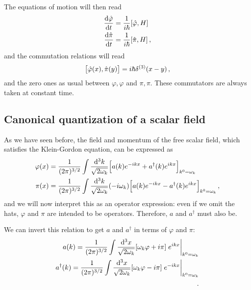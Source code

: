 \documentclass[main.tex]{subfiles}
\begin{document}
The equations of motion will then read 
%
\begin{subequations}
\begin{align}
\dv{\hat{\varphi}}{t} &= \frac{1}{i \hbar} \qty[\hat{\varphi}, H] \\
\dv{\hat{\pi}}{t} &= \frac{1}{i \hbar} \qty[\hat{\pi}, H] 
\,,
\end{align}
\end{subequations}
%
and the commutation relations will read 
%
\begin{align}
\qty[\hat{\varphi}(x), \hat{\pi }(y)] = i \hbar \delta^{(3)}(x-y)
\,,
\end{align}
%
and the zero ones as usual between \(\varphi, \varphi \) and \(\pi , \pi \).
These commutators are always taken at constant time. 

\subsection{Canonical quantization of a scalar field}

As we have seen before, the field and momentum of the free scalar field, which satisfies the Klein-Gordon equation, can be expressed as 
%
\begin{subequations}
\begin{align}
\varphi (x) &= \frac{1}{(2\pi )^{3/2}} \int \frac{ \dd[3]{k}}{\sqrt{2 \omega_{k}}} \qty[a(k) e^{-ikx} + a^{\dag}(k) e^{ikx}]_{k^{0} =\omega_{k}} \\
\pi (x) &= \frac{1}{(2\pi )^{3/2}} \int \frac{ \dd[3]{k}}{\sqrt{2 \omega_{k}}} (-i \omega_{k}) \qty[a(k) e^{-ikx} - a^{\dag}(k) e^{ikx}]_{k^{0} =\omega_{k}} 
\,,
\end{align}
\end{subequations}
%
and we will now interpret this as an operator expression: even if we omit the hats, \(\varphi \) and \(\pi \) are intended to be operators. 
Therefore, \(a\) and \(a^{\dag}\) must also be. 

\begin{claim}
We can invert this relation to get \(a\) and \(a^{\dag}\) in terms of \(\varphi \) and \(\pi \): 
%
\begin{subequations}
\begin{align}
    a(k) = \frac{1}{(2 \pi )^{3/2}} \int \frac{ \dd[3]{x}}{\sqrt{2 \omega_{k}}} \qty[\omega_{k} \varphi + i \pi ] \eval{e^{ikx}}_{k^{0}= \omega_{k}} \\
    a^{\dag}(k) = \frac{1}{(2 \pi )^{3/2}} \int \frac{ \dd[3]{x}}{\sqrt{2 \omega_{k}}} \qty[\omega_{k} \varphi - i \pi ] \eval{e^{-ikx}}_{k^{0}= \omega_{k}} \\
    \,.
\end{align}
\end{subequations}
\end{claim}
\end{document}
